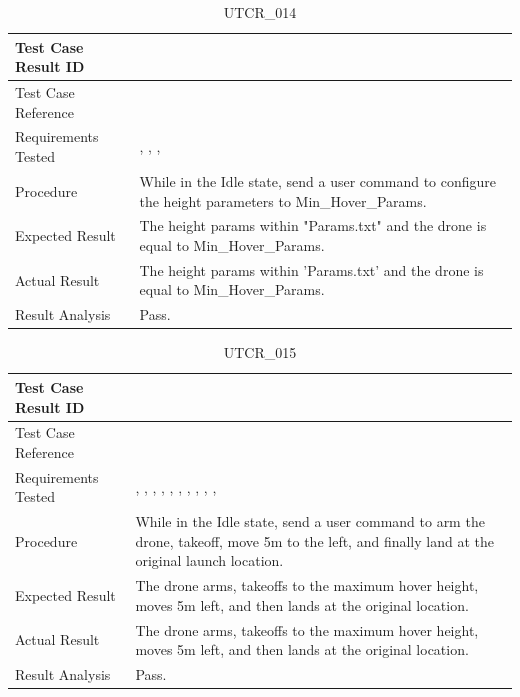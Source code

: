 \documentclass[12pt, titlepage]{article}
\begin{document}
\begin{table}[!h]
\begin{center}
\caption {UTCR\_014}
\label{tab:UTCR_014}
\begin{tabular}{ | m{3.2cm} | m{12.2cm} | } 
\hline
Test Case Result ID & \nameref{tab:UTCR_014} \\ 
\hline
Test Case Reference & \nameref{tab:UTC_014}  \\ 
\hline
Requirements Tested & \nameref{STA_004}, \nameref{GEN_003}, \nameref{TRANS_003}, \nameref{TRANS_015} \\ 
\hline
Procedure & While in the Idle state, send a user command to configure the height parameters to Min\_Hover\_Params. \\ 
\hline
Expected Result & The height params within "Params.txt" and the drone is equal to Min\_Hover\_Params. \\
\hline
Actual Result & The height params within 'Params.txt' and the drone is equal to Min\_Hover\_Params. \\
\hline
Result Analysis & Pass. \\ 
\hline
\end{tabular}
\end{center}
\end{table}

\begin{table}[!h]
\begin{center}
\caption {UTCR\_015}
\label{tab:UTCR_015}
\begin{tabular}{ | m{3.2cm} | m{12.2cm} | } 
\hline
Test Case Result ID & \nameref{tab:UTCR_015} \\ 
\hline
Test Case Reference & \nameref{tab:UTC_015}  \\ 
\hline
Requirements Tested & \nameref{STA_000}, \nameref{STA_001}, \nameref{STA_004}, \nameref{STA_011}, \nameref{STA_012}, \nameref{STA_013}, \nameref{TRANS_003}, \nameref{TRANS_009}, \nameref{TRANS_012}, \nameref{TRANS_013}, \nameref{TRANS_014} \\ 
\hline
Procedure & While in the Idle state, send a user command to arm the drone, takeoff, move 5m to the left, and finally land at the original launch location. \\ 
\hline
Expected Result & The drone arms, takeoffs to the maximum hover height, moves 5m left, and then lands at the original location. \\
\hline
Actual Result & The drone arms, takeoffs to the maximum hover height, moves 5m left, and then lands at the original location. \\
\hline
Result Analysis & Pass. \\ 
\hline
\end{tabular}
\end{center}
\end{table}
\end{document}
